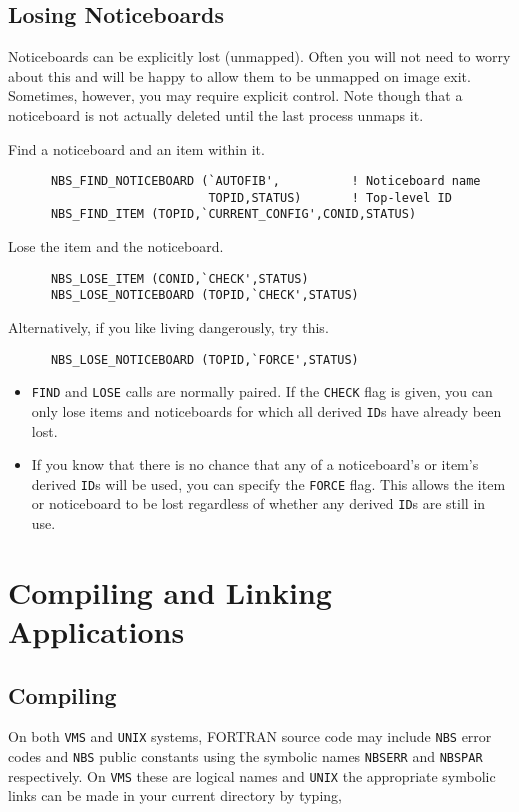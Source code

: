 \documentclass[twoside,11pt]{article}
\renewcommand{\_}{\texttt{\symbol{95}}}
\begin{document}
\subsection {Losing Noticeboards}

Noticeboards can be explicitly lost (unmapped). Often you will not need to
worry about this and will be happy to allow them to be unmapped on image exit.
Sometimes, however, you may require explicit control. Note though that a
noticeboard is not actually deleted until the last process unmaps it.

Find a noticeboard and an item within it.

\begin{verbatim}
      NBS_FIND_NOTICEBOARD (`AUTOFIB',          ! Noticeboard name
                            TOPID,STATUS)       ! Top-level ID
      NBS_FIND_ITEM (TOPID,`CURRENT_CONFIG',CONID,STATUS)
\end{verbatim}

Lose the item and the noticeboard.

\begin{verbatim}
      NBS_LOSE_ITEM (CONID,`CHECK',STATUS)
      NBS_LOSE_NOTICEBOARD (TOPID,`CHECK',STATUS)
\end{verbatim}

Alternatively, if you like living dangerously, try this.

\begin{verbatim}
      NBS_LOSE_NOTICEBOARD (TOPID,`FORCE',STATUS)
\end{verbatim}

\begin{itemize}
\item {\tt FIND} and {\tt LOSE} calls are normally paired. If the {\tt CHECK}
flag is given, you can only lose items and noticeboards for which all derived
{\tt ID}s have already been lost.
\item If you know that there is no chance that any of a noticeboard's or item's
derived {\tt ID}s will be used, you can specify the {\tt FORCE} flag. This
allows the item or noticeboard to be lost regardless of whether any derived
{\tt ID}s are still in use.
\end{itemize}

\section {Compiling and Linking Applications}

\subsection{Compiling}
On both {\tt VMS} and {\tt UNIX} systems, FORTRAN source code may
include {\tt NBS} error codes and {\tt NBS} public constants using
the symbolic names {\tt NBS\_ERR} and {\tt NBS\_PAR} respectively.
On {\tt VMS} these are logical names and {\tt UNIX} the appropriate
symbolic links can be made in your current directory by typing,
\end{document}
